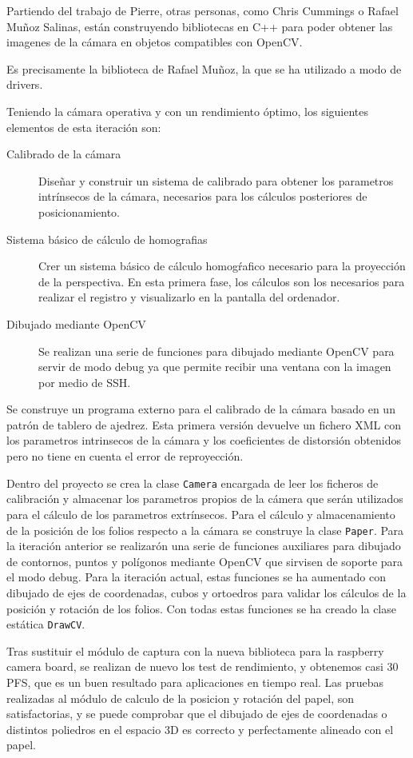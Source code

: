 Partiendo del trabajo de Pierre, otras personas, como Chris Cummings o Rafael Muñoz Salinas, están construyendo bibliotecas en C++ para poder obtener las imagenes de la cámara en objetos compatibles con OpenCV.

Es precisamente la biblioteca de Rafael Muñoz, la que se ha utilizado a modo de drivers. 

Teniendo la cámara operativa y con un rendimiento óptimo, los siguientes elementos de esta iteración son:
\begin{description}
\item [Calibrado de la cámara] Diseñar y construir un sistema de calibrado para obtener los parametros intrínsecos de la cámara, necesarios para los cálculos posteriores de posicionamiento.
\item [Sistema básico de cálculo de homografias] Crer un sistema básico de cálculo homogŕafico necesario para la proyección de la perspectiva. En esta primera fase, los cálculos son los necesarios para realizar el registro y visualizarlo en la pantalla del ordenador.
\item [Dibujado mediante OpenCV] Se realizan una serie de funciones para dibujado mediante OpenCV para servir de modo debug ya que permite recibir una ventana con la imagen por medio de SSH.
\end{description}

Se construye un programa externo para el calibrado de la cámara basado en un patrón de tablero de ajedrez. Esta primera versión devuelve un fichero XML con los parametros intrinsecos de la cámara y los coeficientes de distorsión obtenidos pero no tiene en cuenta el error de reproyección.

Dentro del proyecto se crea la clase \texttt{Camera} encargada de leer los ficheros de calibración y almacenar los parametros propios de la cámera que serán utilizados para el cálculo de los parametros extrínsecos. 
Para el cálculo y almacenamiento de la posición de los folios respecto a la cámara se construye la clase \texttt{Paper}.
Para la iteración anterior se realizarón una serie de funciones auxiliares para dibujado de contornos, puntos y polígonos mediante OpenCV que sirvisen de soporte para el modo debug. Para la iteración actual, estas funciones se ha aumentado con dibujado de ejes de coordenadas, cubos y ortoedros para validar los cálculos de la posición y rotación de los folios. Con todas estas funciones se ha creado la clase estática \texttt{DrawCV}. 

Tras sustituir el módulo de captura con la nueva biblioteca para la raspberry camera board, se realizan de nuevo los test de rendimiento, y obtenemos casi 30 PFS, que es un buen resultado para aplicaciones en tiempo real.
Las pruebas realizadas al módulo de calculo de la posicion y rotación del papel, son satisfactorias, y se puede comprobar que el dibujado de ejes de coordenadas o distintos poliedros en el espacio 3D es correcto y perfectamente alineado con el papel. 

